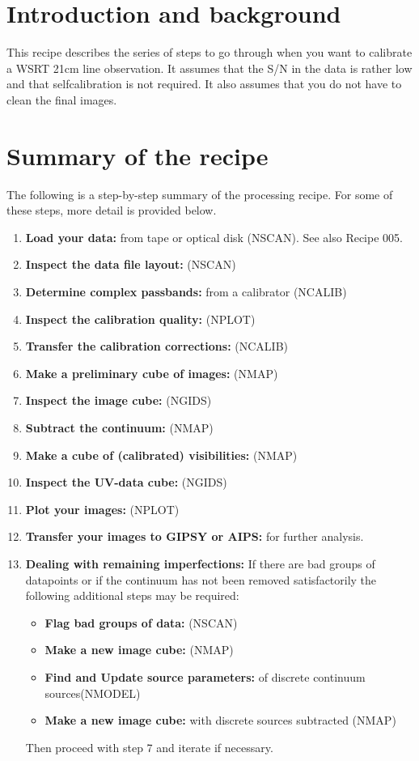 \newpage 
\section{Introduction and background} 
\label{.intro} 

This recipe describes the series of steps to go through when you want to
calibrate a WSRT 21cm line observation. It assumes that the S/N in the data is
rather low and that selfcalibration is not required. It also assumes that you
do not have to clean the final images. 


\section{Summary of the recipe} 
\label{.summary} 

The following is a step-by-step summary of the processing recipe. For some of
these steps, more detail is provided below. 

\begin{enumerate} 
\item {\bf Load your data:} from tape or optical disk (NSCAN). See also Recipe
005. 
\item {\bf Inspect the data file layout:} (NSCAN) 
\item {\bf Determine complex passbands:} from a calibrator (NCALIB) 
\item {\bf Inspect the calibration quality:} (NPLOT) 
\item {\bf Transfer the calibration corrections:} (NCALIB) 
\item {\bf Make a preliminary cube of images:} (NMAP) 
\item {\bf Inspect the image cube:} (NGIDS) 
\item {\bf Subtract the continuum:} (NMAP) 
\item {\bf Make a cube of (calibrated) visibilities:} (NMAP) 
\item {\bf Inspect the UV-data cube:} (NGIDS) 
\item {\bf Plot your images:} (NPLOT) 
\item {\bf Transfer your images to GIPSY or AIPS:} for further analysis. 
\item {\bf Dealing with remaining imperfections:} If there are bad groups of
datapoints or if the continuum has not been removed satisfactorily the
following additional steps may be required: 
  \begin{itemize} 
  \item {\bf Flag bad groups of data:} (NSCAN) 
  \item {\bf Make a new image cube:} (NMAP) 
  \item {\bf Find and Update source parameters:} 
  of discrete continuum sources(NMODEL) 
  \item {\bf Make a new image cube:} 
  with discrete sources subtracted (NMAP) 
  \end{itemize} Then proceed with step 7 and iterate if necessary. 
\end{enumerate} 




